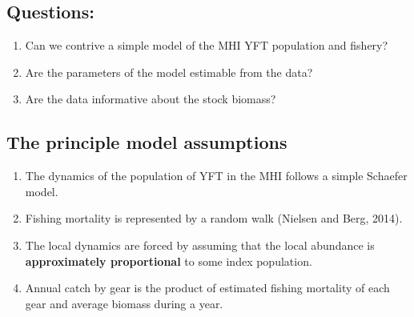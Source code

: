 \documentclass[letterpaper,KOMA,landscape,titlepage]{powersem}
\begin{document}
\begin{slide}\section{Questions:}
\begin{enumerate}
\item Can we contrive a simple model of the MHI YFT population and
fishery?
\item Are the parameters of the model estimable from the data?
\item Are the data informative about the stock biomass?
\end{enumerate}
\end{slide}

\begin{slide}\section{The principle model assumptions}
\begin{enumerate}
\item The dynamics of the population of YFT in the MHI follows a
simple Schaefer model.
\item Fishing mortality is represented by a random walk (Nielsen and
Berg, 2014).
\item The local dynamics are forced by assuming that the local
abundance is {\bfseries approximately proportional} to some index population.
\item Annual catch by gear is the product of estimated fishing mortality
of each gear and average biomass during a year.
\end{enumerate}
\end{slide}
\end{document}

